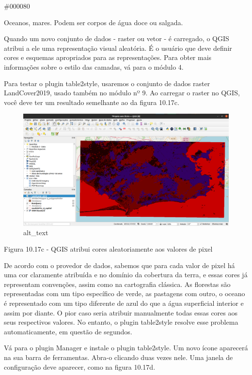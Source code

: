 \documentclass[
  portuguese,
]{krantz}
\begin{document}
\#000080

Oceanos, mares. Podem ser corpos de água doce ou salgada.

Quando um novo conjunto de dados - raster ou vetor - é carregado, o QGIS atribui a ele uma representação visual aleatória. É o usuário que deve definir cores e esquemas apropriados para as representações. Para obter mais informações sobre o estilo das camadas, vá para o módulo 4.

Para testar o plugin table2style, usaremos o conjunto de dados raster LandCover2019, usado também no módulo nº 9. Ao carregar o raster no QGIS, você deve ter um resultado semelhante ao da figura 10.17c.

\begin{figure}
\centering
\includegraphics{media/modulo10/fig1017_c.png}
\caption{alt\_text}
\end{figure}

Figura 10.17c - QGIS atribui cores aleatoriamente aos valores de pixel

De acordo com o provedor de dados, sabemos que para cada valor de pixel há uma cor claramente atribuída e no domínio da cobertura da terra, e essas cores já representam convenções, assim como na cartografia clássica. As florestas são representadas com um tipo específico de verde, as pastagens com outro, o oceano é representado com um tipo diferente de azul do que a água superficial interior e assim por diante. O pior caso seria atribuir manualmente todas essas cores aos seus respectivos valores. No entanto, o plugin table2style resolve esse problema automaticamente, em questão de segundos.

Vá para o plugin Manager e instale o plugin table2style. Um novo ícone aparecerá na sua barra de ferramentas. Abra-o clicando duas vezes nele. Uma janela de configuração deve aparecer, como na figura 10.17d.
\end{document}
